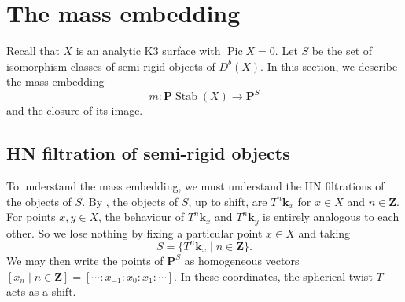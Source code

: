 \documentclass{amsart}
\begin{document}
\section{The mass embedding}\label{sec:mass}
Recall that \(X\) is an analytic K3 surface with \(\operatorname{Pic} X = 0\).
Let \(S\) be the set of isomorphism classes of semi-rigid objects of \(D^b(X)\).
In this section, we describe the mass embedding
\[ m \colon \mathbf{P} \operatorname{Stab}(X) \to \mathbf{P}^S\]
and the closure of its image.

\subsection{HN filtration of semi-rigid objects}
To understand the mass embedding, we must understand the HN filtrations of the objects of \(S\).
By , the objects of \(S\), up to shift, are \(T^n \mathbf{k}_x\) for \(x \in X\) and \(n \in \mathbf{Z}\).
For points \(x,y \in X\), the behaviour of \(T^n \mathbf{k}_x\) and \(T^n \mathbf{k}_y\) is entirely analogous to each other.
So we lose nothing by fixing a particular point \(x \in X\) and taking
\[ S = \{T^{n} \mathbf{k}_x \mid n \in \mathbf{Z}\}.\]
We may then write the points of \(\mathbf{P}^S\) as homogeneous vectors \([x_n \mid n \in \mathbf{Z}] = [\cdots : x_{-1} :x_0 :x_1 : \cdots]\).
In these coordinates, the spherical twist \(T\) acts as a shift.
\end{document}
